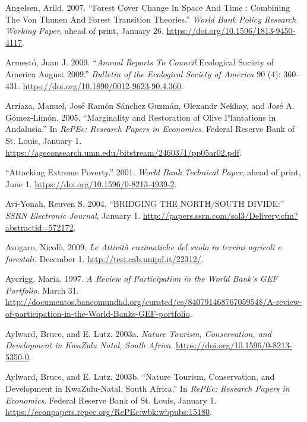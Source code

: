 \begin{CSLReferences}{1}{1}
Angelsen, Arild. 2007. {``Forest Cover Change In Space And Time :
Combining The Von Thunen And Forest Transition Theories.''} \emph{World
Bank Policy Research Working Paper}, ahead of print, January 26.
\url{https://doi.org/10.1596/1813-9450-4117}.

Armestó, Juan J. 2009. {``\emph{Annual Reports To Council} Ecological
Society of America August 2009.''} \emph{Bulletin of the Ecological
Society of America} 90 (4): 360--431.
\url{https://doi.org/10.1890/0012-9623-90.4.360}.

Arriaza, Manuel, José Ramón Sánchez Guzmán, Olexandr Nekhay, and José A.
Gómez‐Limón. 2005. {``Marginality and Restoration of Olive Plantations
in Andalusia.''} In \emph{RePEc: Research Papers in Economics}. Federal
Reserve Bank of St. Louis, January 1.
\url{https://ageconsearch.umn.edu/bitstream/24603/1/pp05ar02.pdf}.

{``Attacking Extreme Poverty.''} 2001. \emph{World Bank Technical
Paper}, ahead of print, June 1.
\url{https://doi.org/10.1596/0-8213-4939-2}.

Avi-Yonah, Reuven S. 2004. {``BRIDGING THE NORTH/SOUTH DIVIDE:''}
\emph{SSRN Electronic Journal}, January 1.
\url{http://papers.ssrn.com/sol3/Delivery.cfm?abstractid=572172}.

Avogaro, Nicolò. 2009. \emph{Le Attività enzimatiche del suolo in
terrini agricoli e forestali.} December 1.
\url{http://tesi.cab.unipd.it/22312/}.

Aycrigg, Maria. 1997. \emph{A Review of Participation in the World
Bank's GEF Portfolio}. March 31.
\url{http://documentos.bancomundial.org/curated/es/840791468767059548/A-review-of-participation-in-the-World-Banks-GEF-portfolio}.

Aylward, Bruce, and E. Lutz. 2003a. \emph{Nature Tourism, Conservation,
and Development in KwaZulu Natal, South Africa}.
\url{https://doi.org/10.1596/0-8213-5350-0}.

Aylward, Bruce, and E. Lutz. 2003b. {``Nature Tourism, Conservation, and
Development in KwaZulu-Natal, South Africa.''} In \emph{RePEc: Research
Papers in Economics}. Federal Reserve Bank of St. Louis, January 1.
\url{https://econpapers.repec.org/RePEc:wbk:wbpubs:15180}.


\end{CSLReferences}

